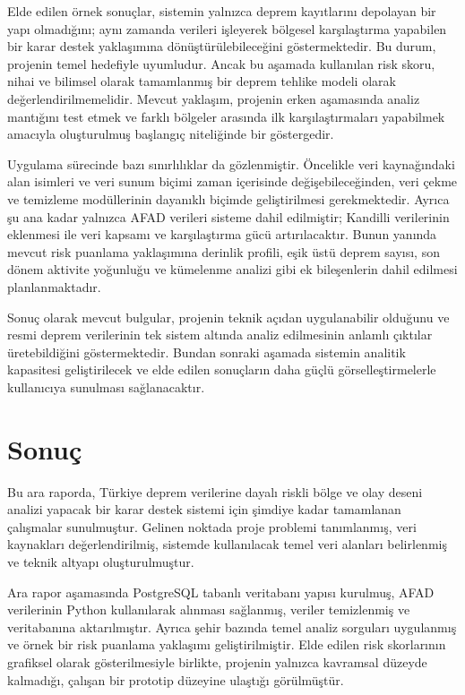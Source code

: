 \documentclass[12pt,a4paper]{report}
\begin{document}
Elde edilen örnek sonuçlar, sistemin yalnızca deprem kayıtlarını depolayan bir yapı
olmadığını; aynı zamanda verileri işleyerek bölgesel karşılaştırma yapabilen bir karar
destek yaklaşımına dönüştürülebileceğini göstermektedir. Bu durum, projenin temel
hedefiyle uyumludur. Ancak bu aşamada kullanılan risk skoru, nihai ve bilimsel olarak
tamamlanmış bir deprem tehlike modeli olarak değerlendirilmemelidir. Mevcut yaklaşım,
projenin erken aşamasında analiz mantığını test etmek ve farklı bölgeler arasında ilk
karşılaştırmaları yapabilmek amacıyla oluşturulmuş başlangıç niteliğinde bir göstergedir.

Uygulama sürecinde bazı sınırlılıklar da gözlenmiştir. Öncelikle veri kaynağındaki alan
isimleri ve veri sunum biçimi zaman içerisinde değişebileceğinden, veri çekme ve temizleme
modüllerinin dayanıklı biçimde geliştirilmesi gerekmektedir. Ayrıca şu ana kadar yalnızca
AFAD verileri sisteme dahil edilmiştir; Kandilli verilerinin eklenmesi ile veri kapsamı
ve karşılaştırma gücü artırılacaktır. Bunun yanında mevcut risk puanlama yaklaşımına
derinlik profili, eşik üstü deprem sayısı, son dönem aktivite yoğunluğu ve kümelenme
analizi gibi ek bileşenlerin dahil edilmesi planlanmaktadır.

Sonuç olarak mevcut bulgular, projenin teknik açıdan uygulanabilir olduğunu ve resmi
deprem verilerinin tek sistem altında analiz edilmesinin anlamlı çıktılar üretebildiğini
göstermektedir. Bundan sonraki aşamada sistemin analitik kapasitesi geliştirilecek ve
elde edilen sonuçların daha güçlü görselleştirmelerle kullanıcıya sunulması sağlanacaktır.

\chapter{Sonuç}

Bu ara raporda, Türkiye deprem verilerine dayalı riskli bölge ve olay deseni analizi
yapacak bir karar destek sistemi için şimdiye kadar tamamlanan çalışmalar sunulmuştur.
Gelinen noktada proje problemi tanımlanmış, veri kaynakları değerlendirilmiş, sistemde
kullanılacak temel veri alanları belirlenmiş ve teknik altyapı oluşturulmuştur.

Ara rapor aşamasında PostgreSQL tabanlı veritabanı yapısı kurulmuş, AFAD verilerinin
Python kullanılarak alınması sağlanmış, veriler temizlenmiş ve veritabanına aktarılmıştır.
Ayrıca şehir bazında temel analiz sorguları uygulanmış ve örnek bir risk puanlama
yaklaşımı geliştirilmiştir. Elde edilen risk skorlarının grafiksel olarak gösterilmesiyle
birlikte, projenin yalnızca kavramsal düzeyde kalmadığı, çalışan bir prototip düzeyine
ulaştığı görülmüştür.
\end{document}
